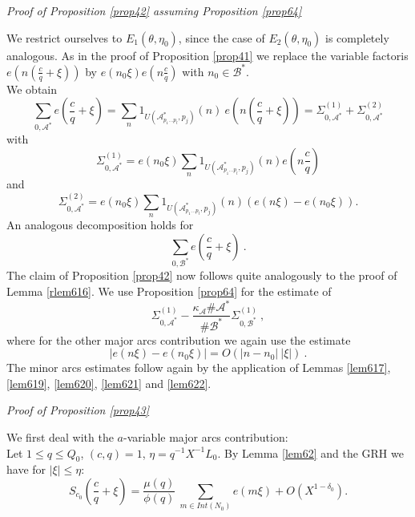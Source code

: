 \documentclass{amsart}
\numberwithin{equation}{subsection}
\begin{document}
\textit{Proof of Proposition \ref{prop42} assuming Proposition \ref{prop64}}

\noindent We restrict ourselves to $E_1(\theta, \eta_0)$, since the case of $E_2(\theta, \eta_0)$ is completely analogous. As in the proof of Proposition \ref{prop41} we replace the variable factoris $e(n(\frac{c}{q}+\xi))$ by $e(n_0\xi)e(n\frac{c}{q})$ with $n_0\in\mathcal{B}^*$.\\
We obtain
$$\sum_{0, \mathcal{A}^*}e\left(\frac{c}{q}+\xi\right)=\sum_{n}1_{U(\mathcal{A}^*_{p_1\ldots p_l}, p_j)}(n)\:e\left(n\left(\frac{c}{q}+\xi\right)\right)=\Sigma_{0, \mathcal{A}^*}^{(1)}  +\Sigma_{0, \mathcal{A}^*}^{(2)}  $$
with
$$\Sigma_{0, \mathcal{A}^*}^{(1)}= e(n_0\xi) \sum_{n}1_{U(\mathcal{A}^*_{p_1\ldots p_l}, p_j)}(n) e\left(n\frac{c}{q}\right)$$
and
$$\Sigma_{0, \mathcal{A}^*}^{(2)}= e(n_0\xi) \sum_{n}1_{U(\mathcal{A}^*_{p_1\ldots p_l}, p_j)}(n) ( e(n\xi)-e(n_0\xi)).$$
An analogous decomposition holds for
$$\sum_{0, \mathcal{B}^*}e\left(\frac{c}{q}+\xi\right)\:.$$
The claim of Proposition \ref{prop42} now follows quite analogously to the proof of Lemma \ref{rlem616}. We use Proposition \ref{prop64} for the estimate of
$$\Sigma_{0, \mathcal{A}^*}^{(1)}  -\frac{\kappa_{\mathcal{A}}\#\mathcal{A}^*}{\#\mathcal{B}^*}  \Sigma_{0, \mathcal{B}^*}^{(1)}\:, $$
where for the other major arcs contribution we again use the estimate 
$$|e(n\xi)-e(n_0\xi)|=O(|n-n_0|\:|\xi|)\:.$$
The minor arcs estimates follow again by the application of Lemmas \ref{lem617}, \ref{lem619}, \ref{lem620}, \ref{lem621} and \ref{lem622}.

\textit{Proof of Proposition \ref{prop43}}

\noindent We first deal with  the $a$-variable major arcs contribution:\\
Let $1\leq q\leq Q_0$, $(c, q)=1$, $\eta=q^{-1}X^{-1}L_0$. By Lemma \ref{lem62} and the GRH we have for $|\xi|\leq \eta$:
$$S_{c_0}\left(\frac{c}{q}+\xi\right)=\frac{\mu(q)}{\phi(q)}\:\sum_{m\in Int(N_0)} e(m\xi)+O(X^{1-\delta_0}).$$
\end{document}
